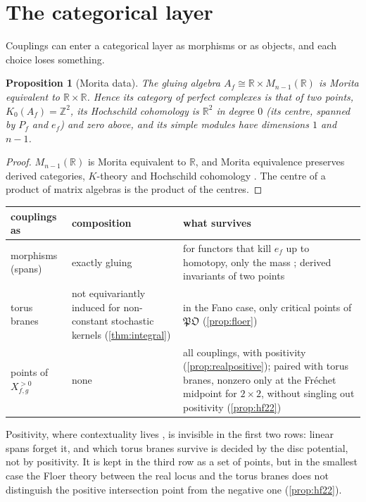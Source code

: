 \documentclass[11pt]{article}
\newtheorem{proposition}[theorem]{Proposition}
\theoremstyle{definition}
\theoremstyle{remark}
\newcommand{\R}{\mathbb{R}}
\newcommand{\Z}{\mathbb{Z}}
\begin{document}
\section{The categorical layer}\label{sec:categorical}

Couplings can enter a categorical layer as morphisms or as objects, and each choice loses something.

\begin{proposition}[Morita data]\label{prop:morita}
The gluing algebra $A_f\cong\R\times M_{n-1}(\R)$ \cite[Thm.~2.2]{Algebras} is Morita equivalent to $\R\times\R$. Hence its
category of perfect complexes is that of two points, $K_0(A_f)=\Z^2$, its Hochschild cohomology is $\R^2$ in degree $0$ (its centre, spanned
by $P_f$ and $e_f$) and zero above, and its simple modules have dimensions $1$ and $n-1$.
\end{proposition}
\begin{proof}
$M_{n-1}(\R)$ is Morita equivalent to $\R$, and Morita equivalence preserves derived categories, $K$-theory and Hochschild
cohomology \cite{Keller2006}. The centre of a product of matrix algebras is the product of the centres.
\end{proof}

\begin{center}
\begin{tabular}{p{3.2cm}p{4.6cm}p{6.2cm}}
\toprule
couplings as & composition & what survives\\
\midrule
morphisms (spans) & exactly gluing \cite{Algebras} & for functors that kill $e_f$ up to homotopy, only the mass \cite[Cor.~5.3]{Algebras}; derived invariants of two points\\
torus branes & not equivariantly induced for non-constant stochastic kernels (\cref{thm:integral}) & in the Fano case, only critical points of $\mathfrak{PO}$ (\cref{prop:floer})\\
points of $X^{>0}_{f,g}$ & none & all couplings, with positivity (\cref{prop:realpositive}); paired with torus branes, nonzero only at the Fréchet midpoint for $2\times2$, without singling out positivity (\cref{prop:hf22})\\
\bottomrule
\end{tabular}
\end{center}

Positivity, where contextuality lives \cite[Cor.~5.3]{Algebras}, is invisible in the first two rows: linear spans forget it, and
which torus branes survive is decided by the disc potential, not by positivity. It is kept in the third row as a set of points, but in the
smallest case the Floer theory between the real locus and the torus branes does not distinguish the positive intersection point from the
negative one (\cref{prop:hf22}).
\end{document}
